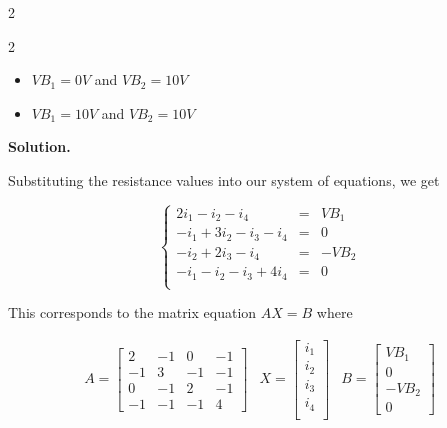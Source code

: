 \documentclass{ximera}
\begin{document}
\begin{example}
\begin{multicols}{2}
\begin{itemize}
\end{itemize}

\end{multicols}

\begin{multicols}{2}

\begin{itemize}

\item  $V\!B_1 = 0 V$ and $V\!B_2 = 10 V$

\item  $V\!B_1 = 10 V$ and $V\!B_2 = 10 V$

\end{itemize} 

\end{multicols}


{\bf Solution.}  

 Substituting the resistance values into our system of equations, we get

\[ \left\{ \begin{array}{rcl} 2i_1 - i_2-i_4 & = & V\!B_1 \\
-i_1 + 3i_2 - i_3 - i_4 & = & 0 \\
-i_2 + 2i_3 - i_4 & = & -V\!B_2 \\
-i_1 - i_2-i_3 + 4i_4 & = & 0 \\  \end{array} \right.\]
                              
This corresponds to the matrix equation $AX = B$ where 

\[ \begin{array}{ccc} 

A = \left[ \begin{array}{rrrr} 2 & -1 & 0 & -1  \\ -1 & 3 & -1 & -1 \\ 0 & -1 & 2 & -1 \\ -1 & -1 & -1 & 4 \end{array} \right] 

&

 X = \left[ \begin{array}{r} i_1 \\ i_2 \\ i_3 \\ i_4 \\ \end{array} \right]
 
&

 B = \left[ \begin{array}{r} V\!B_1 \\ 0 \\ -V\!B_2 \\ 0 \end{array} \right] 
 \end{array}\]   


\end{example}
\end{document}
